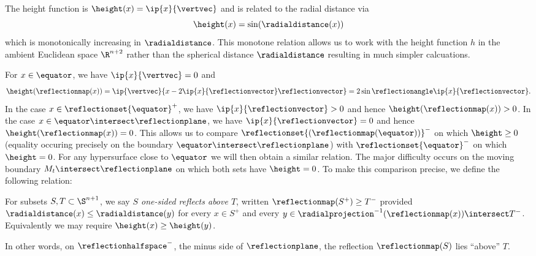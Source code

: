 \documentclass[12pt]{amsart}
\begin{document}
The height function is \(\height(x) = \ip{x}{\vertvec}\) and is related to the radial distance via
\[
\height(x) = \sin(\radialdistance(x))
\]
which is monotonically increasing in \(\radialdistance\). This monotone relation allows us to work with the height function \(h\) in the ambient Euclidean space \(\R^{n+2}\) rather than the spherical distance \(\radialdistance\) resulting in much simpler calcuations.

For \(x \in \equator\), we have \(\ip{x}{\vertvec} = 0\) and
\begin{equation}
\label{eq:equatorheight}
\height(\reflectionmap(x)) = \ip{\vertvec}{x - 2 \ip{x}{\reflectionvector} \reflectionvector} = 2 \sin\reflectionangle \ip{x}{\reflectionvector}.
\end{equation}
In the case \(x \in \reflectionset{\equator}^+\), we have \(\ip{x}{\reflectionvector} > 0\) and hence \(\height(\reflectionmap(x)) > 0\). In the case \(x \in \equator \intersect \reflectionplane\), we have \(\ip{x}{\reflectionvector} = 0\) and hence \(\height(\reflectionmap(x)) = 0\). This allows us to compare \(\reflectionset{(\reflectionmap(\equator))}^-\) on which \(\height\geq 0\) (equality occuring precisely on the boundary \(\equator \intersect \reflectionplane\)) with \(\reflectionset{\equator}^-\) on which \(\height = 0\). For any hypersurface close to \(\equator\) we will then obtain a similar relation. The major difficulty occurs on the moving boundary \(M_t \intersect \reflectionplane\) on which both sets have \(\height = 0\). To make this comparison precise, we define the following relation:

\begin{definition}
For subsets \(S,T \subset \S^{n+1}\), we say \emph{\(S\) one-sided reflects above \(T\)}, written \(\reflectionmap(S^+) \geq T^-\) provided \(\radialdistance(x) \leq \radialdistance(y)\) for every \(x \in S^+\) and every \(y \in \radialprojection^{-1} (\reflectionmap(x)) \intersect T^-\). Equivalently we may require \(\height(x) \geq \height(y)\).
\end{definition}

In other words, on \(\reflectionhalfspace^-\), the minus side of \(\reflectionplane\), the reflection \(\reflectionmap(S)\) lies ``above'' \(T\).
\end{document}
